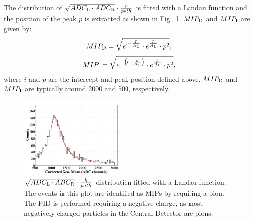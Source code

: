 The distribution of $\sqrt{ADC_{\rm{L}}\cdot ADC_{\rm{R}}}\cdot \frac{h}{path} $ is fitted with a Landau function and the position of the peak $p$ is extracted as shown in Fig.~\ref{energy}.
$MIP_{\rm{D}}$ and $MIP_{\rm{I}}$ are given by:
\begin{equation}
MIP_{\rm{D}}=\sqrt{e^{i-\frac{L}{A_{\rm{L}}}}\cdot e^{\frac{L}{A_{\rm{L}}}}\cdot p^2},
\end{equation}
\begin{equation}
MIP_{\rm{I}}=\sqrt{e^{-\left(i-\frac{L}{A_{\rm{L}}}\right)}\cdot e^{\frac{L}{A_{\rm{L}}}}\cdot p^2},
\end{equation}
where $i$ and $p$ are the intercept and peak position defined above.
$MIP_{\rm{D}}$ and $MIP_{\rm{I}}$ are typically around 2000 and 500, respectively.

\begin{figure}
\begin{center}
\includegraphics[width=0.45\textwidth]{Figure/energy.png} 
\caption{$\sqrt{ADC_{\rm{L}}\cdot ADC_{\rm{R}}}\cdot \frac{h}{path} $ distribution fitted with a Landau function. The events in this plot are identified as MIPs by requiring a pion. The PID is performed requiring a negative charge, as most negatively charged particles in the Central Detector are pions.}
\label{energy}
\end{center}
\end{figure}

